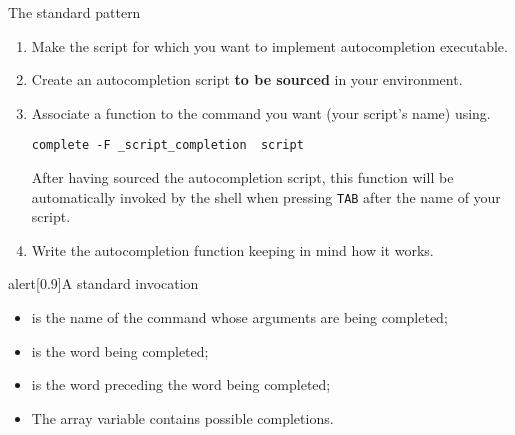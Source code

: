 \begin{frame}[fragile]{The standard pattern}
    \vspace{-3mm}
    \begin{enumerate}
        \item Make the script for which you want to implement autocompletion executable.
        \item Create an autocompletion script \textbf{to be sourced} in your environment.
        \item Associate a function to the command you want (your script's name) using.
              \begin{lstlisting}[style=myBash, numbers=none, aboveskip=3mm, belowskip=-5mm, xrightmargin=15mm]
                  complete -F _script_completion  script
              \end{lstlisting}
              After having sourced the autocompletion script, this function will be automatically invoked by the shell when pressing \texttt{TAB} after the name of your script.
        \item Write the autocompletion function keeping in mind how it works.
    \end{enumerate}
    \begin{varblock}{alert}[0.9\textwidth]{A standard invocation}
        \begin{itemize}
            \item {} is the name of the command whose arguments are being completed;
            \item {} is the word being completed;
            \item {} is the word preceding the word being completed;
            \item The array variable  contains possible completions.
        \end{itemize}
    \end{varblock}
\end{frame}

